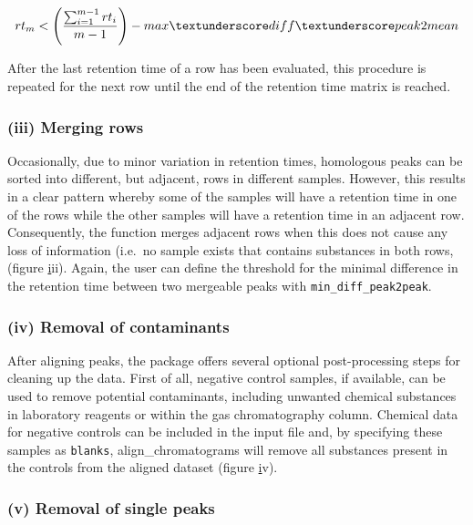\begin{equation}
\label{eq:two}
rt_{m} < \left(\frac{\sum_{i=1}^{m-1}rt_{i}}{m-1}\right) - max\textunderscore diff\textunderscore peak2mean
\end{equation}

After the last retention time of a row has been evaluated, this
procedure is repeated for the next row until the end of the retention
time matrix is reached.

\subsubsection{(iii) Merging rows}\label{iii-merging-rows}

Occasionally, due to minor variation in retention times, homologous
peaks can be sorted into different, but adjacent, rows in different
samples. However, this results in a clear pattern whereby some of the
samples will have a retention time in one of the rows while the other
samples will have a retention time in an adjacent row. Consequently, the
function merges adjacent rows when this does not cause any loss of
information (i.e.~no sample exists that contains substances in both
rows, (figure \href{figure:algorithm} iii). Again, the user can define
the threshold for the minimal difference in the retention time between
two mergeable peaks with \texttt{min\_diff\_peak2peak}. \par 

\subsubsection{(iv) Removal of
contaminants}\label{iv-removal-of-contaminants}

After aligning peaks, the package offers several optional
post-processing steps for cleaning up the data. First of all, negative
control samples, if available, can be used to remove potential
contaminants, including unwanted chemical substances in laboratory
reagents or within the gas chromatography column. Chemical data for
negative controls can be included in the input file and, by specifying
these samples as \texttt{blanks}, align\_chromatograms will remove all
substances present in the controls from the aligned dataset (figure
\href{figure:algorithm} iv).

\subsubsection{(v) Removal of single
peaks}\label{v-removal-of-single-peaks}

